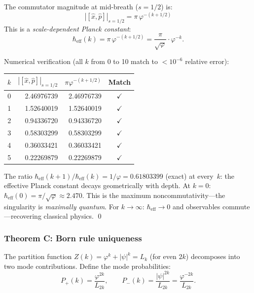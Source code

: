 \documentclass[12pt,a4paper]{article}
\begin{document}
The commutator magnitude at mid-breath ($s = 1/2$) is:
\begin{equation}
\boxed{|[\hat{x}, \hat{p}]|_{s=1/2} = \pi \, \varphi^{-(k+1/2)}}
\end{equation}
This is a \emph{scale-dependent Planck constant}:
\begin{equation}
\hbar_{\mathrm{eff}}(k) = \pi \, \varphi^{-(k+1/2)} = \frac{\pi}{\sqrt{\varphi}} \cdot \varphi^{-k}.
\end{equation}

Numerical verification (all $k$ from 0 to 10 match to $< 10^{-6}$ relative error):

\begin{center}
\small
\begin{tabular}{|c|r|r|c|}
\hline
$k$ & $|[\hat{x}, \hat{p}]|_{s=1/2}$ & $\pi \varphi^{-(k+1/2)}$ & Match \\
\hline
0 & 2.46976739 & 2.46976739 & $\checkmark$ \\
1 & 1.52640019 & 1.52640019 & $\checkmark$ \\
2 & 0.94336720 & 0.94336720 & $\checkmark$ \\
3 & 0.58303299 & 0.58303299 & $\checkmark$ \\
4 & 0.36033421 & 0.36033421 & $\checkmark$ \\
5 & 0.22269879 & 0.22269879 & $\checkmark$ \\
\hline
\end{tabular}
\end{center}

The ratio $\hbar_{\mathrm{eff}}(k{+}1)/\hbar_{\mathrm{eff}}(k) = 1/\varphi = 0.61803399$ (exact) at every~$k$: the effective Planck constant decays geometrically with depth. At $k = 0$: $\hbar_{\mathrm{eff}}(0) = \pi/\sqrt{\varphi} \approx 2.470$. This is the maximum noncommutativity---the singularity is \emph{maximally quantum}. For $k \to \infty$: $\hbar_{\mathrm{eff}} \to 0$ and observables commute---recovering classical physics. \qed

\subsubsection{Theorem C: Born rule uniqueness}

The partition function $Z(k) = \varphi^k + |\psi|^k = L_k$ (for even $2k$) decomposes into two mode contributions. Define the mode probabilities:
\begin{equation}
P_+(k) = \frac{\varphi^{2k}}{L_{2k}}, \qquad P_-(k) = \frac{|\psi|^{2k}}{L_{2k}} = \frac{\varphi^{-2k}}{L_{2k}}.
\end{equation}
\end{document}
